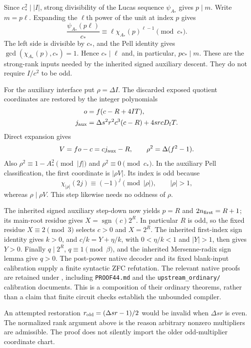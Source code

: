 Since $c_*^2\mid |I|$, strong divisibility of the Lucas sequence
$\psi_{A_*}$ gives $p\mid m$. Write $m=p\ell$. Expanding the
$\ell$th power of the unit at index $p$ gives
\[
 \frac{\psi_{A_*}(p\ell)}{c_*}
 \equiv\ell\chi_{A_*}(p)^{\ell-1}\pmod{c_*}.
\]
The left side is divisible by $c_*$, and the Pell identity gives
$\gcd(\chi_{A_*}(p),c_*)=1$. Hence $c_*\mid\ell$ and, in
particular, $pc_*\mid m$. These are the strong-rank inputs needed
by the inherited signed auxiliary descent. They do not require $I/c^2$
to be odd.

For the auxiliary interface put $\rho=\Delta I$. The discarded
exposed quotient coordinates are restored by the integer polynomials
\begin{align*}
 o&=f(c-R+4IT),\\
 j_{\rm aux}&=\Delta s^2r^2c^3(c-R)+4srcD_{\mathrm f} T.
\end{align*}
Direct expansion gives
\[
 V=fo-c=cj_{\rm aux}-R,
 \qquad \rho^2=\Delta(f^2-1).
\]
Also $\rho^2\equiv1-A_*^2\pmod{|f|}$ and
$\rho^2\equiv0\pmod{c_*}$. In the auxiliary Pell classification,
the first coordinate is $|\rho V|$. Its index is odd because
\[
 \chi_{|\rho|}(2j)\equiv(-1)^j\pmod{|\rho|},
 \qquad |\rho|>1,
\]
whereas $\rho\mid\rho V$. This step likewise needs no oddness of
$\rho$.

The inherited signed auxiliary step-down now yields $p=R$ and
$2n_{\rm first}=R+1$; its main-root residue gives
$X=\operatorname{sgn}(c)2^R$. In particular $R$ is odd, so the
fixed residue $X\equiv2\pmod3$ selects $c>0$ and $X=2^R$.
The inherited first-index sign identity gives $k>0$, and
$c/k=Y+\eta/k$, with $0<\eta/k<1$ and $|Y|>1$, then gives
$Y>0$. Finally $q\mid2^R$, $q\equiv1\pmod\beta$, and the
inherited Mersenne-radix sign lemma give $q>0$. The post-power native
decoder and its fixed blank-input calibration supply a finite syntactic
ZFC refutation. The relevant native proofs are retained under
, including
\texttt{PROOF44.md} and the \texttt{upstream\_ordinary/} calibration
documents. This is a composition of their ordinary theorems, rather than
a claim that finite circuit checks establish the unbounded compiler.

\begin{remark}
An attempted restoration $r_{\rm old}=(\Delta sr-1)/2$ would be
invalid when $\Delta sr$ is even. The normalized rank argument above
is the reason arbitrary nonzero multipliers are admissible. The proof
does not silently import the older odd-multiplier coordinate chart.
\end{remark}


